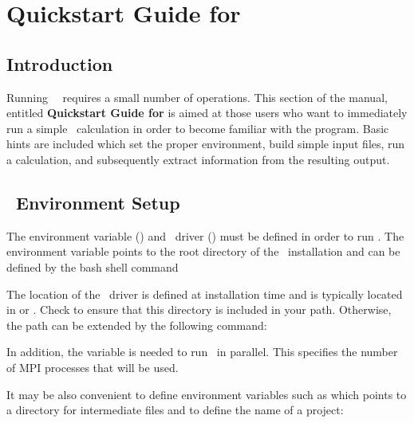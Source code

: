 
\chapter{Quickstart Guide for \molcas }

\section{Introduction}

Running \molcas\ \molcasversion\ requires a small number of operations.
This section of the manual, entitled \textbf{Quickstart Guide for \molcas }
is aimed at those users who want to immediately
run a simple \molcas\ calculation in order to become familiar with the program.
Basic hints are included which set the proper environment, build simple input files, run a calculation, and
subsequently extract information from the resulting output.

\section{\molcas\ Environment Setup}

The environment variable () and \molcas\ driver () must be defined in order to run \molcas.
The  environment variable points to the root directory of the \molcas\ installation and
can be defined by the bash shell command


The location of the \molcas\ driver is defined at installation time and is
typically located in  or .
Check to ensure that this directory is included in your path. Otherwise, the path can be extended
by the following command:


In addition, the variable  is needed to run \molcas\ in parallel. This specifies the number of MPI processes that will be used.

It may be also convenient to define environment variables such as  which points to a directory for intermediate
files and  to define the name of a project:


